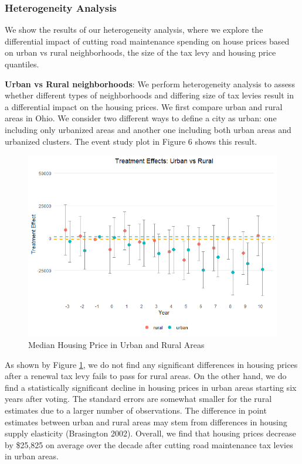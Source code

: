 \subsubsection{Heterogeneity Analysis} We show the results of our heterogeneity analysis, where we explore the differential impact of cutting road maintenance spending on house prices based on urban vs rural neighborhoods, the size of the tax levy and housing price quantiles.

\vskip 0.5cm

\textbf{Urban vs Rural neighborhoods}: We perform heterogeneity analysis to assess whether different types of neighborhoods and differing size of tax levies result in a differential impact on the housing prices. We first compare urban and rural areas in Ohio. We consider two different ways to define a city as urban:  one including only urbanized areas and another one including both urban areas and urbanized clusters. The event study plot in Figure 6 shows this result. 

\begin{figure}[htbp]
    \centering
    \includegraphics[width=\textwidth,keepaspectratio]{images/tes_covs_ua_reg.png}        
    \caption{Median Housing Price in Urban and Rural Areas}
    \label{fig:tes_covs_ua}
\end{figure}

As shown by Figure \ref{fig:tes_covs_ua}, we do not find any significant differences in housing prices after a renewal tax levy fails to pass for rural areas. On the other hand, we do find a statistically significant decline in housing prices in urban areas starting six years after voting. The standard errors are somewhat smaller for the rural estimates due to a larger number of observations. The difference in point estimates between urban and rural areas may stem from differences in housing supply elasticity (Brasington 2002). Overall, we find that housing prices decrease by \$25,825 on average over the decade after cutting road maintenance tax levies in urban areas. 

